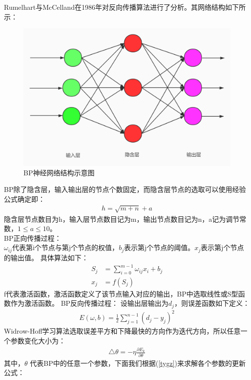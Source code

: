 \par
Rumelhart与McCelland在1986年对反向传播算法进行了分析。其网络结构如下所示：
\begin{figure}[htbp]
    \centering
    \includegraphics[width=13cm]{figure/BP.jpg}
    \caption{BP神经网络结构示意图}
    \label{fig-BP}
\end{figure}
BP除了隐含层，输入输出层的节点个数固定，而隐含层节点的选取可以使用经验公式确定即：
\begin{align}
    h = \sqrt{m+n} +a
\end{align}
隐含层节点数目为h，输入层节点数目记为m，输出节点数目记为n，a记为调节常数，$1 \le a \le 10$。\\
BP正向传播过程：\\
$\omega_{ij}$代表第i个节点与第j个节点的权值，$b_j$表示第j个节点的阈值。$x_j$表示第j个节点的输出值。
具体算法如下：
\begin{align}
    S_j  &= \sum_{i=0}^{m-1} \omega_{ij} x_i + b_j \\
    x_j &= f(S_j)
\end{align}
f代表激活函数，激活函数定义了该节点输入对应的输出，BP中选取线性或S型函数作为激活函数。
BP反向传播过程：
设输出层输出为$d_j$，则误差函数如下定义：
\begin{align}
    E(\omega, b) = \frac{1}{2} \sum_{j=1}^{n-1} (d_j-y_j)^2
\end{align}
Widrow-Hoff学习算法选取误差平方和下降最快的方向作为迭代方向，所以任意一个参数变化大小为：
\begin{align}
    \bigtriangleup \theta = - \eta \frac{\partial E_k}{\partial \theta} \label{tygz}%
\end{align}
其中，$\theta$ 代表BP中的任意一个参数，下面我们根据(\ref{tygz})来求解各个参数的更新公式：\\
